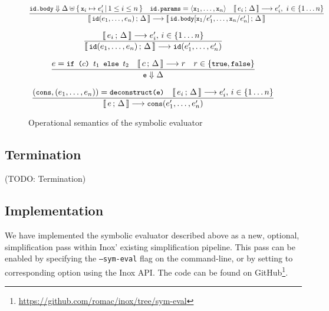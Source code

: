 \documentclass[a4paper,twoside]{article}
\newcommand{\lb}[2]{\llbracket\, #1\,;\, #2\, \rrbracket}
\newcommand{\TODO}[1]{\textcolor{YellowOrange}{(TODO: #1)}} %
\newcommand{\stt}[1]{\texttt{\small{#1}}}
\begin{document}
\begin{landscape}
\begin{figure}[htb]
\begin{framed}
\begin{equation}
\dfrac{
 \stt{id.body} \Downarrow \Delta \uplus \{\,\stt{x}_i \mapsto e_i'\,|\, 1 \leq i \leq n\,\}
 \quad
 \stt{id.params} = \langle \stt{x}_1, \ldots, \stt{x}_n \rangle
 \quad
 \lb{e_i}{\Delta} \longrightarrow e_i',\  i \in \{1 \ldots n\}
}{
  \lb{\stt{id}(e_1,\ldots,e_n)}{\Delta} \longrightarrow
  \lb{\stt{id.body}[\stt{x}_1/e_1',\ldots,\stt{x}_n/e_n']}{\Delta}
}
\label{fig:symbolicsem:fi2}
\end{equation}

\begin{equation}
\dfrac{
 \lb{e_i}{\Delta} \longrightarrow e_i',\, i \in \{1 \ldots n\}
}{
  \lb{\stt{id}(e_1,\ldots,e_n)}{\Delta} \longrightarrow
  \stt{id}(e_1',\ldots,e_n')
}
\label{fig:symbolicsem:fi3}
\end{equation}

\begin{equation}
\dfrac{
 e = \stt{if ($c$) $t_1$ else $t_2$} \quad
 \lb{c}{\Delta} \longrightarrow r \quad
 r \in \{\stt{true}, \stt{false}\}
}{
  \stt{e} \Downarrow \Delta
}
\end{equation}

\begin{equation}
\dfrac{
  (\stt{cons}, (e_1, \ldots, e_n)) = \stt{deconstruct(e)} \quad
  \lb{e_i}{\Delta} \longrightarrow e_i',\, i \in \{1 \ldots n\}
}{
  \lb{e}{\Delta} \longrightarrow \stt{cons}(e_1', \ldots, e_n')
}
\end{equation}

\end{framed}
\vspace{-10pt}
\caption{Operational semantics of the symbolic evaluator \label{fig:symbolicsem}}
\end{figure}
\end{landscape}

\subsection{Termination}

\TODO{Termination}

\subsection{Implementation}

We have implemented the symbolic evaluator described above as a new, optional, simplification pass within Inox' existing simplification pipeline. This pass can be enabled by specifying the \texttt{---sym-eval} flag on the command-line, or by setting to corresponding option using the Inox API. The code can be found on GitHub\footnote{\url{https://github.com/romac/inox/tree/sym-eval}}.
\end{document}
